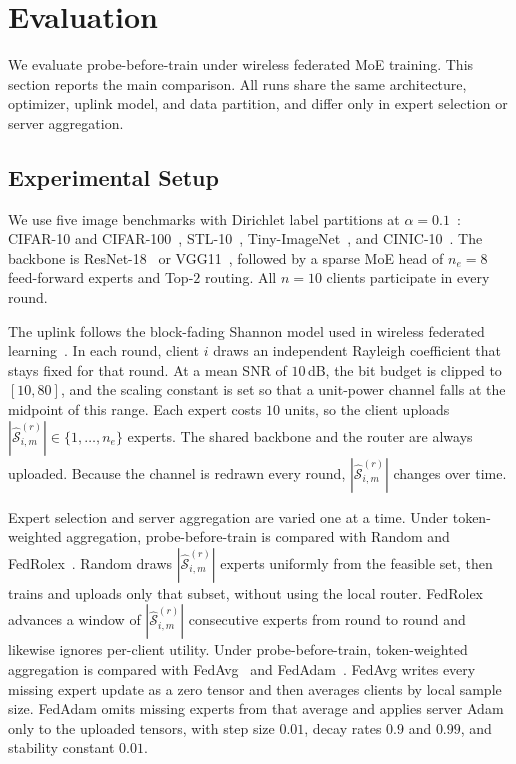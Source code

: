 \section{Evaluation}
\label{sec:evaluation}

We evaluate probe-before-train under wireless federated MoE training. This section reports the main comparison. All runs share the same architecture, optimizer, uplink model, and data partition, and differ only in expert selection or server aggregation.

\subsection{Experimental Setup}

We use five image benchmarks with Dirichlet label partitions at $\alpha=0.1$~\cite{hsu2019measuring}: CIFAR-10 and CIFAR-100~\cite{krizhevsky2009learning}, STL-10~\cite{coates2011analysis}, Tiny-ImageNet~\cite{le2015tiny}, and CINIC-10~\cite{darlow2018cinic}. The backbone is ResNet-18~\cite{he2016deep} or VGG11~\cite{simonyan2015very}, followed by a sparse MoE head of $n_e=8$ feed-forward experts and Top-$2$ routing. All $n=10$ clients participate in every round.

The uplink follows the block-fading Shannon model used in wireless federated learning~\cite{xu2021client,zhou2022time}. In each round, client $i$ draws an independent Rayleigh coefficient that stays fixed for that round. At a mean SNR of $10$\,dB, the bit budget is clipped to $[10,80]$, and the scaling constant is set so that a unit-power channel falls at the midpoint of this range. Each expert costs $10$ units, so the client uploads $|\widehat{\mathcal{S}}_{i,m}^{(r)}|\in\{1,\ldots,n_e\}$ experts. The shared backbone and the router are always uploaded. Because the channel is redrawn every round, $|\widehat{\mathcal{S}}_{i,m}^{(r)}|$ changes over time.

Expert selection and server aggregation are varied one at a time. Under token-weighted aggregation, probe-before-train is compared with Random and FedRolex~\cite{alam2022fedrolex}. Random draws $|\widehat{\mathcal{S}}_{i,m}^{(r)}|$ experts uniformly from the feasible set, then trains and uploads only that subset, without using the local router. FedRolex advances a window of $|\widehat{\mathcal{S}}_{i,m}^{(r)}|$ consecutive experts from round to round and likewise ignores per-client utility. Under probe-before-train, token-weighted aggregation is compared with FedAvg~\cite{mcmahan2017communication} and FedAdam~\cite{reddi2021adaptive}. FedAvg writes every missing expert update as a zero tensor and then averages clients by local sample size. FedAdam omits missing experts from that average and applies server Adam only to the uploaded tensors, with step size $0.01$, decay rates $0.9$ and $0.99$, and stability constant $0.01$.

